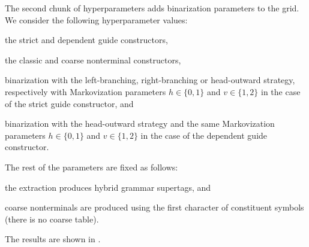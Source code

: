 \documentclass[../../document.tex]{subfiles}
\begin{document}
    The second chunk of hyperparameters adds binarization parameters to the grid.
    We consider the following hyperparameter values:
    \begin{compactitem}
        \item the strict and dependent guide constructors,
        \item the classic and coarse nonterminal constructors,
        \item binarization with the left-branching, right-branching or head-outward strategy, respectively with Markovization parameters \(h \in \{0,1\}\) and \(v \in \{1,2\}\) in the case of the strict guide constructor, and
        \item binarization with the head-outward strategy and the same Markovization parameters \(h \in \{0,1\}\) and \(v \in \{1,2\}\) in the case of the dependent guide constructor.
    \end{compactitem}
    The rest of the parameters are fixed as follows:
    \begin{compactitem}
        \item the extraction produces hybrid grammar supertags, and
        \item coarse nonterminals are produced using the first character of constituent symbols (there is no coarse table).
    \end{compactitem}
    The results are shown in .
    
\end{document}
